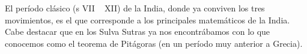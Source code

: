 El período clásico (s VII ~ XII) de la India, donde ya conviven los tres movimientos, es el que corresponde a los principales matemáticos de la India. Cabe destacar que en los Sulva Sutras ya nos encontrábamos con lo que conocemos como el teorema de Pitágoras (en un período muy anterior a Grecia). 